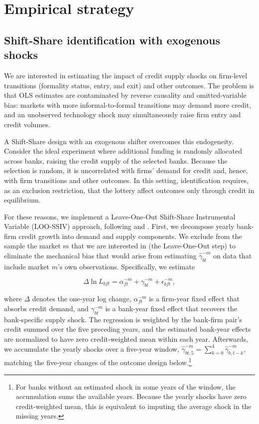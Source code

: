\documentclass[12pt]{article}
\begin{document}
\section{Empirical strategy} \label{empirical_strategy_section}

\subsection{Shift-Share identification with exogenous shocks}

We are interested in estimating the impact of credit supply shocks on firm-level transitions (formality status, entry, and exit) and other outcomes. The problem is that OLS estimates are contaminated by reverse causality and omitted-variable bias: markets with more informal-to-formal transitions may demand more credit, and an unobserved technology shock may simultaneously raise firm entry and credit volumes.

A Shift-Share design with an exogenous shifter overcomes this endogeneity. Consider the ideal experiment where additional funding is randomly allocated across banks, raising the credit supply of the selected banks. Because the selection is random, it is uncorrelated with firms' demand for credit and, hence, with firm transitions and other outcomes. In this setting, identification requires, as an exclusion restriction, that the lottery affect outcomes only through credit in equilibrium.

For these reasons, we implement a Leave-One-Out Shift-Share Instrumental Variable (LOO-SSIV) approach, following \citet{amiti2018much} and \citet{greenstone2020credit}. First, we decompose yearly bank-firm credit growth into demand and supply components. We exclude from the sample the market $m$ that we are interested in (the Leave-One-Out step) to eliminate the mechanical bias that would arise from estimating $\hat{\gamma}_{bt}^{-m}$ on data that include market $m$'s own observations. Specifically, we estimate

\begin{equation} \label{fe}
    \Delta \ln L_{bft} = \alpha_{ft}^{-m} + \gamma_{bt}^{-m} + \epsilon_{bft}^{-m},
\end{equation}

where $\Delta$ denotes the one-year log change, $\alpha_{ft}^{-m}$ is a firm-year fixed effect that absorbs credit demand, and $\gamma_{bt}^{-m}$ is a bank-year fixed effect that recovers the bank-specific supply shock.
The regression is weighted by the bank-firm pair's credit summed over the five preceding years, and the estimated bank-year effects are normalized to have zero credit-weighted mean within each year. Afterwards, we accumulate the yearly shocks over a five-year window, $\hat{\gamma}_{bt,5}^{-m} = \sum_{k=0}^{4} \hat{\gamma}_{b,t-k}^{-m}$, matching the five-year changes of the outcome design below.\footnote{For banks without an estimated shock in some years of the window, the accumulation sums the available years. Because the yearly shocks have zero credit-weighted mean, this is equivalent to imputing the average shock in the missing years.}
\end{document}

